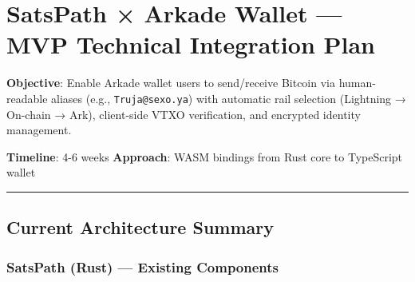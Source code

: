 \documentclass[
]{article}
\author{}
\date{}
\begin{document}
\hypertarget{satspath-arkade-wallet-mvp-technical-integration-plan}{%
\section{SatsPath × Arkade Wallet --- MVP Technical Integration
Plan}\label{satspath-arkade-wallet-mvp-technical-integration-plan}}

\textbf{Objective}: Enable Arkade wallet users to send/receive Bitcoin
via human-readable aliases (e.g., \texttt{Truja@sexo.ya}) with automatic
rail selection (Lightning → On-chain → Ark), client-side VTXO
verification, and encrypted identity management.

\textbf{Timeline}: 4-6 weeks \textbar{} \textbf{Approach}: WASM bindings
from Rust core to TypeScript wallet

\begin{center}\rule{0.5\linewidth}{0.5pt}\end{center}

\hypertarget{current-architecture-summary}{%
\subsection{Current Architecture
Summary}\label{current-architecture-summary}}

\hypertarget{satspath-rust-existing-components}{%
\subsubsection{SatsPath (Rust) --- Existing
Components}\label{satspath-rust-existing-components}}
\end{document}
